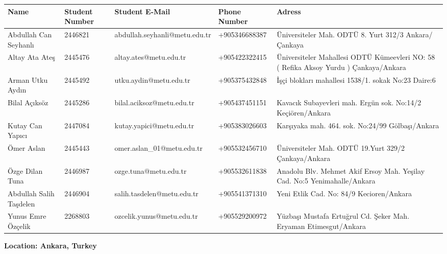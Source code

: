 \documentclass[12pt]{report}
\begin{document}
\begin{center}
\scriptsize
    \begin{tabular}{|p{2cm}|p{1.5cm}|p{4cm}|p{2cm}|p{5cm}|}
        \hline
        \textbf{Name} & \textbf{Student Number} & \textbf{Student E-Mail} & \textbf{Phone Number} & \textbf{Adress}\\ \hline
        Abdullah Can Seyhanlı & 2446821 & abdullah.seyhanli@metu.edu.tr & +905346688387 & Üniversiteler Mah. ODTÜ 8. Yurt 312/3 Ankara/Çankaya \\ \hline
        Altay Ata Ateş & 2445476 & altay.ates@metu.edu.tr & +905422322415 & Üniversiteler Mahallesi ODTÜ Kümeevleri NO: 58 ( Refika Aksoy Yurdu ) Çankaya/Ankara \\ \hline
        Arman Utku Aydın & 2445492 & utku.aydin@metu.edu.tr & +905375432848 & İşçi blokları mahallesi 1538/1. sokak No:23 Daire:6 \\ \hline
        Bilal Açıksöz & 2445286 & bilal.aciksoz@metu.edu.tr & +905437451151 & Kavacık Subayevleri mah. Ergün sok. No:14/2 Keçiören/Ankara \\ \hline
        Kutay Can Yapıcı & 2447084 & kutay.yapici@metu.edu.tr & +905383026603 & Karşıyaka mah. 464. sok. No:24/99 Gölbaşı/Ankara \\ \hline
        Ömer Aslan & 2445443 & omer.aslan\_01@metu.edu.tr & +905532456710 & Üniversiteler Mah. ODTÜ 19.Yurt 329/2 Çankaya/Ankara \\ \hline
        Özge Dilan Tuna & 2446987 & ozge.tuna@metu.edu.tr & +905532611838 & Anadolu Blv. Mehmet Akif Ersoy Mah. Yeşilay Cad. No:5 Yenimahalle/Ankara \\ \hline
         Abdullah Salih Taşdelen & 2446904 & salih.tasdelen@metu.edu.tr & +905541371310 & Yeni Etlik Cad. No: 84/9 Kecioren/Ankara \\ \hline
        Yunus Emre Özçelik & 2268803 & ozcelik.yunus@metu.edu.tr&+905529200972 & Yüzbaşı Mustafa Ertuğrul Cd. Şeker Mah. Eryaman Etimesgut/Ankara \\ \hline
    \end{tabular}
\end{center}

\vfill

\begin{center}
    \textbf{Location: Ankara, Turkey}
\end{center}

\tableofcontents
\end{document}
